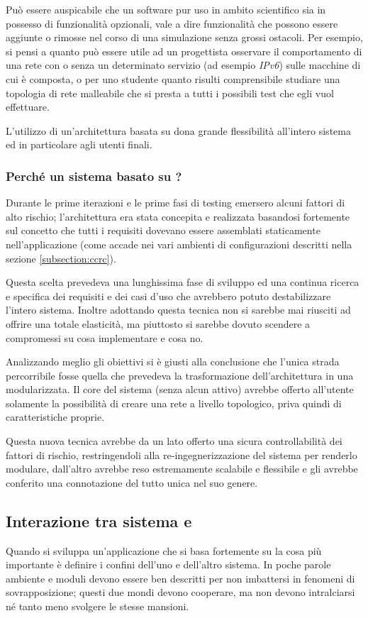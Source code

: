 Può essere auspicabile che un software pur uso in ambito scientifico sia in possesso di funzionalità opzionali, vale a dire funzionalità che possono essere aggiunte o rimosse nel corso di una simulazione senza grossi ostacoli. Per esempio, si pensi a quanto può essere utile ad un progettista osservare il comportamento di una rete con o senza un determinato servizio (ad esempio \emph{IPv6}) sulle macchine di cui è composta, o per uno studente quanto risulti comprensibile studiare una topologia di rete malleabile che si presta a tutti i possibili test che egli vuol effettuare.

L'utilizzo di un'architettura basata su \plugin{} dona grande flessibilità all'intero sistema ed in particolare agli utenti finali.

\subsubsection{Perché un sistema basato su \plugin{}?}
Durante le prime iterazioni e le prime fasi di testing emersero alcuni fattori di alto rischio; l'architettura era stata concepita e realizzata basandosi fortemente sul concetto che tutti i requisiti dovevano essere assemblati staticamente nell'applicazione (come accade nei vari ambienti di configurazioni descritti nella sezione \ref{subsection:ccrc}).

Questa scelta prevedeva una lunghissima fase di sviluppo ed una continua ricerca e specifica dei requisiti e dei casi d'uso che avrebbero potuto destabilizzare l'intero sistema. Inoltre adottando questa tecnica non si sarebbe mai riusciti ad offrire una totale elasticità, ma piuttosto si sarebbe dovuto scendere a compromessi su cosa implementare e cosa no.

Analizzando meglio gli obiettivi si è giusti alla conclusione che l'unica strada percorribile fosse quella che prevedeva la trasformazione dell'architettura in una modularizzata. Il core del sistema (senza alcun \plugin{} attivo) avrebbe offerto all'utente solamente la possibilità di creare una rete a livello topologico, priva quindi di caratteristiche proprie.

Questa nuova tecnica avrebbe da un lato offerto una sicura controllabilità dei fattori di rischio, restringendoli alla re-ingegnerizzazione del sistema per renderlo modulare, dall'altro avrebbe reso \visualnetkit{} estremamente scalabile e flessibile e gli avrebbe conferito una connotazione del tutto unica nel suo genere.

\subsection{Interazione tra sistema e \plugin{}}
Quando si sviluppa un'applicazione che si basa fortemente su \plugin{} la cosa più importante è definire i confini dell'uno e dell'altro sistema. In poche parole ambiente e moduli devono essere ben descritti per non imbattersi in fenomeni di sovrapposizione; questi due mondi devono cooperare, ma non devono intralciarsi né tanto meno svolgere le stesse mansioni.

